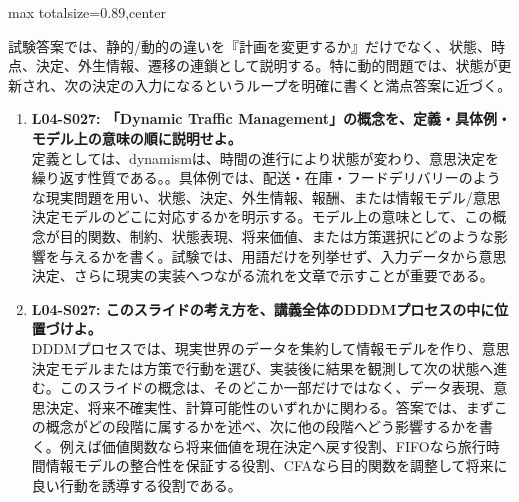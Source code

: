 \begin{minipage}[t]{0.58\textwidth}
\begin{adjustbox}{max totalsize={\textwidth}{0.89\textheight},center}
\begin{minipage}{\textwidth}
試験答案では、静的/動的の違いを『計画を変更するか』だけでなく、状態、時点、決定、外生情報、遷移の連鎖として説明する。特に動的問題では、状態が更新され、次の決定の入力になるというループを明確に書くと満点答案に近づく。\par{}\begin{enumerate}\item \textbf{L04-S027: 「Dynamic Traffic Management」の概念を、定義・具体例・モデル上の意味の順に説明せよ。}\\定義としては、dynamismは、時間の進行により状態が変わり、意思決定を繰り返す性質である。。具体例では、配送・在庫・フードデリバリーのような現実問題を用い、状態、決定、外生情報、報酬、または情報モデル/意思決定モデルのどこに対応するかを明示する。モデル上の意味として、この概念が目的関数、制約、状態表現、将来価値、または方策選択にどのような影響を与えるかを書く。試験では、用語だけを列挙せず、入力データから意思決定、さらに現実の実装へつながる流れを文章で示すことが重要である。\item \textbf{L04-S027: このスライドの考え方を、講義全体のDDDMプロセスの中に位置づけよ。}\\DDDMプロセスでは、現実世界のデータを集約して情報モデルを作り、意思決定モデルまたは方策で行動を選び、実装後に結果を観測して次の状態へ進む。このスライドの概念は、そのどこか一部だけではなく、データ表現、意思決定、将来不確実性、計算可能性のいずれかに関わる。答案では、まずこの概念がどの段階に属するかを述べ、次に他の段階へどう影響するかを書く。例えば価値関数なら将来価値を現在決定へ戻す役割、FIFOなら旅行時間情報モデルの整合性を保証する役割、CFAなら目的関数を調整して将来に良い行動を誘導する役割である。\end{enumerate}
\end{minipage}
\end{adjustbox}
\end{minipage}


